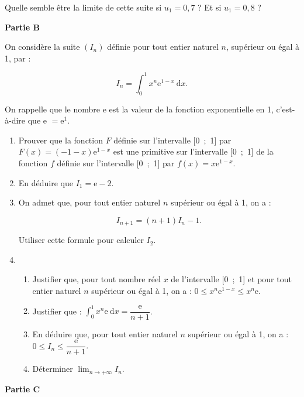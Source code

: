 \documentclass{cornouaille}
\begin{document}
\begin{exercice}[Pondichéry 2019]
\begin{enumerate}
Quelle semble être la limite de cette suite si $u_1 = 0,7$ ? Et si $u_1 = 0,8$ ? 
\end{enumerate}

\bigskip

\textbf{Partie B} 

\medskip

On considère la suite $\left(I_n\right)$ définie pour tout entier naturel $n$, supérieur ou égal à 1, par : 

\[I_n = \displaystyle\int_0^1 x^n \text{e}^{1 - x}\:\text{d}x.\]

On rappelle que le nombre e est la valeur de la fonction exponentielle en 1, c'est-à-dire que e $= \text{e}^1$.

\medskip 

\begin{enumerate}
\item Prouver que la fonction $F$ définie sur l'intervalle [0~;~1] par $F(x)=(- 1 - x)\text{e}^{1 - x}$ est une primitive sur l'intervalle [0~;~1] de la fonction $f$ définie sur l'intervalle [0~;~1] par $f(x) = x \text{e}^{1 - x}$.
\item En déduire que $I_1 = \text{e} - 2$. 
\item On admet que, pour tout entier naturel $n$ supérieur ou égal à 1, on a : 

\[I_{n+1} =  (n+1)I_{n} - 1.\] 

Utiliser cette formule pour calculer $I_2$. 
\item 
	\begin{enumerate}
		\item Justifier que, pour tout nombre réel $x$ de l'intervalle [0~;~1] et pour tout entier naturel $n$ supérieur ou égal à 1, on a : $0 \leqslant x^n \text{e}^{1-x} \leqslant  x^n \text{e}$. 
		\item Justifier que : $\displaystyle\int_0^1 x^n\text{e}\:\text{d}x = \dfrac{\text{e}}{n+ 1}$. 
		\item En déduire que, pour tout entier naturel $n$ supérieur ou égal à 1, on a : $0 \leqslant I_n \leqslant \dfrac{\text{e}}{n+ 1}$. 
		\item Déterminer $\displaystyle\lim_{n \to + \infty} I_n$. 
	\end{enumerate}
\end{enumerate}

\bigskip

\textbf{Partie C}

\medskip 


\end{exercice}
\end{document}
